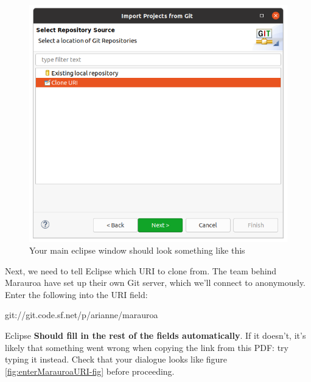 \documentclass[
]{book}
\newenvironment{Shaded}{\begin{snugshade}}{\end{snugshade}}
\newcommand{\NormalTok}[1]{#1}
\begin{document}
\begin{figure}

{\centering \includegraphics[width=1\linewidth]{images/1.4.eclipseCloneFromURI} 

}

\caption{Your main eclipse window should look something like this}\label{fig:eclipseCloneFromURI-fig}
\end{figure}

Next, we need to tell Eclipse which URI to clone from. The team behind Marauroa have set up their own Git server, which we'll connect to anonymously. Enter the following into the URI field:

\begin{Shaded}
\begin{Highlighting}[]
\NormalTok{git://git.code.sf.net/p/arianne/marauroa}
\end{Highlighting}
\end{Shaded}

Eclipse \textbf{Should fill in the rest of the fields automatically}. If it doesn't, it's likely that something went wrong when copying the link from this PDF: try typing it instead. Check that your dialogue looks like figure \ref{fig:enterMarauroaURI-fig} before proceeding.
\end{document}
